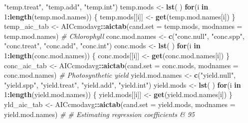 \documentclass[]{scrartcl}
\newenvironment{Shaded}{\begin{snugshade}}{\end{snugshade}}
\newcommand{\CommentTok}[1]{\textcolor[rgb]{0.56,0.35,0.01}{\textit{#1}}}
\newcommand{\ControlFlowTok}[1]{\textcolor[rgb]{0.13,0.29,0.53}{\textbf{#1}}}
\newcommand{\DataTypeTok}[1]{\textcolor[rgb]{0.13,0.29,0.53}{#1}}
\newcommand{\DecValTok}[1]{\textcolor[rgb]{0.00,0.00,0.81}{#1}}
\newcommand{\KeywordTok}[1]{\textcolor[rgb]{0.13,0.29,0.53}{\textbf{#1}}}
\newcommand{\NormalTok}[1]{#1}
\newcommand{\OperatorTok}[1]{\textcolor[rgb]{0.81,0.36,0.00}{\textbf{#1}}}
\newcommand{\StringTok}[1]{\textcolor[rgb]{0.31,0.60,0.02}{#1}}
\begin{document}
\begin{Shaded}
\begin{Highlighting}[]
{{{{{{{{{{{{                           \StringTok{"temp.treat"}\NormalTok{, }\StringTok{"temp.add"}\NormalTok{, }
                           \StringTok{"temp.int"}\NormalTok{)}
\NormalTok{    temp.mods <-}\StringTok{ }\KeywordTok{lst}\NormalTok{( )}
     \ControlFlowTok{for}\NormalTok{(i }\ControlFlowTok{in} \DecValTok{1}\OperatorTok{:}\KeywordTok{length}\NormalTok{(temp.mod.names)) \{}
\NormalTok{        temp.mods[[i]] <-}\StringTok{ }\KeywordTok{get}\NormalTok{(temp.mod.names[i]) \}}
\NormalTok{      temp_aic_tab <-}\StringTok{ }\NormalTok{AICcmodavg}\OperatorTok{::}\KeywordTok{aictab}\NormalTok{(}\DataTypeTok{cand.set =}\NormalTok{ temp.mods, }
                                         \DataTypeTok{modnames =}\NormalTok{ temp.mod.names)}
  \CommentTok{# Chlorophyll }
\NormalTok{    conc.mod.names <-}\StringTok{ }\KeywordTok{c}\NormalTok{(}\StringTok{"conc.null"}\NormalTok{, }\StringTok{"conc.spp"}\NormalTok{, }
                        \StringTok{"conc.treat"}\NormalTok{, }\StringTok{"conc.add"}\NormalTok{, }
                        \StringTok{"conc.int"}\NormalTok{)}
\NormalTok{    conc.mods <-}\StringTok{ }\KeywordTok{lst}\NormalTok{( )}
     \ControlFlowTok{for}\NormalTok{(i }\ControlFlowTok{in} \DecValTok{1}\OperatorTok{:}\KeywordTok{length}\NormalTok{(conc.mod.names)) \{}
\NormalTok{      conc.mods[[i]] <-}\StringTok{ }\KeywordTok{get}\NormalTok{(conc.mod.names[i]) \}}
\NormalTok{     conc_aic_tab <-}\StringTok{ }\NormalTok{AICcmodavg}\OperatorTok{::}\KeywordTok{aictab}\NormalTok{(}\DataTypeTok{cand.set =}\NormalTok{ conc.mods, }
                                        \DataTypeTok{modnames =}\NormalTok{ conc.mod.names)}
  \CommentTok{# Photosynthetic yield}
\NormalTok{    yield.mod.names <-}\StringTok{ }\KeywordTok{c}\NormalTok{(}\StringTok{"yield.null"}\NormalTok{, }\StringTok{"yield.spp"}\NormalTok{, }
                         \StringTok{"yield.treat"}\NormalTok{, }\StringTok{"yield.add"}\NormalTok{, }
                         \StringTok{"yield.int"}\NormalTok{)}
\NormalTok{    yield.mods <-}\StringTok{ }\KeywordTok{lst}\NormalTok{( )}    
    \ControlFlowTok{for}\NormalTok{(i }\ControlFlowTok{in} \DecValTok{1}\OperatorTok{:}\KeywordTok{length}\NormalTok{(yield.mod.names)) \{}
\NormalTok{      yield.mods[[i]] <-}\StringTok{ }\KeywordTok{get}\NormalTok{(yield.mod.names[i]) \}}
\NormalTok{    yld_aic_tab <-}\StringTok{ }\NormalTok{AICcmodavg}\OperatorTok{::}\KeywordTok{aictab}\NormalTok{(}\DataTypeTok{cand.set =}\NormalTok{ yield.mods, }
                                      \DataTypeTok{modnames =}\NormalTok{ yield.mod.names)}
\CommentTok{#}
\CommentTok{# Estimating regression coefficients & 95%
}}}}}}}}}}}}}
\end{Highlighting}
\end{Shaded}
\end{document}
